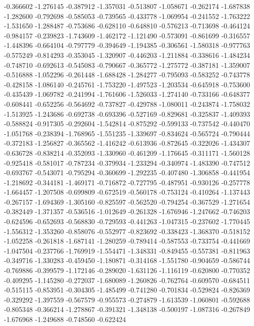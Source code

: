 -0.366602
-1.276145
-0.387912
-1.357031
-0.513807
-1.058671
-0.262174
-1.687838
-1.282600
-0.792698
-0.585053
-0.739565
-0.433778
-1.069954
-0.241552
-1.763222
-1.531650
-1.288487
-0.753686
-0.628110
-0.648810
-0.576213
-0.713698
-0.464124
-0.984157
-0.239823
-1.743609
-1.462172
-1.121490
-0.573091
-0.861699
-0.316557
-1.448396
-0.664104
-0.797779
-0.394649
-1.194385
-0.306561
-1.580318
-0.977763
-0.575249
-0.814293
-0.353045
-1.320907
-0.446203
-1.211884
-0.338616
-1.484234
-0.748710
-0.692613
-0.545083
-0.790667
-0.365772
-1.275772
-0.387181
-1.359007
-0.516888
-1.052296
-0.261448
-1.688428
-1.284277
-0.795093
-0.583252
-0.743778
-0.428158
-1.086140
-0.245761
-1.753220
-1.497523
-1.203534
-0.645918
-0.753600
-0.435439
-1.069782
-0.241994
-1.761606
-1.526033
-1.274140
-0.733166
-0.648377
-0.608441
-0.652256
-0.564692
-0.737827
-0.429788
-1.080011
-0.243874
-1.758032
-1.513925
-1.243686
-0.692738
-0.693396
-0.527169
-0.829681
-0.325837
-1.409393
-0.588824
-0.917305
-0.292604
-1.542814
-0.875292
-0.599133
-0.737542
-0.440470
-1.051768
-0.238394
-1.768965
-1.551235
-1.339697
-0.834624
-0.565724
-0.790444
-0.372183
-1.256827
-0.365562
-1.416242
-0.613936
-0.872645
-0.322026
-1.434307
-0.636728
-0.838214
-0.352093
-1.330960
-0.461209
-1.176645
-0.311171
-1.560128
-0.925418
-0.581017
-0.787234
-0.379934
-1.233294
-0.340974
-1.483390
-0.747512
-0.693767
-0.543071
-0.795294
-0.360699
-1.292235
-0.407480
-1.306858
-0.441954
-1.218692
-0.344181
-1.469171
-0.716872
-0.727795
-0.487951
-0.930126
-0.257778
-1.664457
-1.207508
-0.699809
-0.672519
-0.560178
-0.753124
-0.410264
-1.137443
-0.267157
-1.694369
-1.305160
-0.825597
-0.562520
-0.794254
-0.367529
-1.271654
-0.382449
-1.371357
-0.536516
-1.012649
-0.261328
-1.676946
-1.247662
-0.746203
-0.624596
-0.652693
-0.568830
-0.729593
-0.441263
-1.047315
-0.237602
-1.770445
-1.556312
-1.353260
-0.858076
-0.552977
-0.823692
-0.338423
-1.368370
-0.518152
-1.052258
-0.261818
-1.687141
-1.280259
-0.789414
-0.587553
-0.733754
-0.441669
-1.047504
-0.237766
-1.769919
-1.554471
-1.348331
-0.849455
-0.557381
-0.811963
-0.349716
-1.330283
-0.459450
-1.180871
-0.314168
-1.551780
-0.904659
-0.586744
-0.769886
-0.399579
-1.172146
-0.289020
-1.631126
-1.116119
-0.620800
-0.770352
-0.409295
-1.145280
-0.272037
-1.680089
-1.260826
-0.762764
-0.609570
-0.684511
-0.515115
-0.853951
-0.304305
-1.485499
-0.741280
-0.701834
-0.529824
-0.826369
-0.329292
-1.397559
-0.567579
-0.955573
-0.274879
-1.613539
-1.060801
-0.592688
-0.805348
-0.366214
-1.278867
-0.391321
-1.348138
-0.500197
-1.087316
-0.267849
-1.676968
-1.249688
-0.748560
-0.622424
